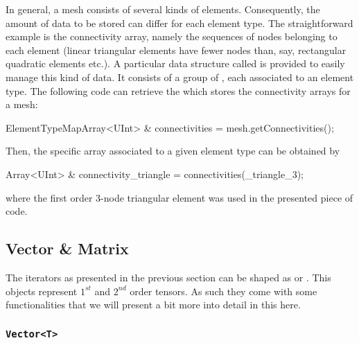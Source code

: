 In general, a mesh consists of several kinds of elements.
Consequently, the amount of data to be stored can differ for each
element type.  The straightforward example is the connectivity array,
namely the sequences of nodes belonging to each element (linear
triangular elements have fewer nodes than, say, rectangular quadratic
elements etc.).  A particular data structure called
 is provided to easily manage this kind of
data.  It consists of a group of , each associated to an
element type.  The following code can retrieve the
 which stores the connectivity arrays for a
mesh:
\begin{cpp}
  ElementTypeMapArray<UInt> & connectivities = mesh.getConnectivities();
\end{cpp}
Then, the specific array associated to a given element type can be obtained by
\begin{cpp}
  Array<UInt> & connectivity_triangle = connectivities(_triangle_3);
\end{cpp}
where the first order 3-node triangular element was used in the presented piece
of code.

\subsection{Vector \& Matrix}

The  iterators as presented in the previous section can be shaped as
 or . This objects represent $1^{st}$ and $2^{nd}$
order tensors. As such they come with some functionalities that we will present
a bit more into detail in this here.

\subsubsection{\texttt{Vector<T>}}

